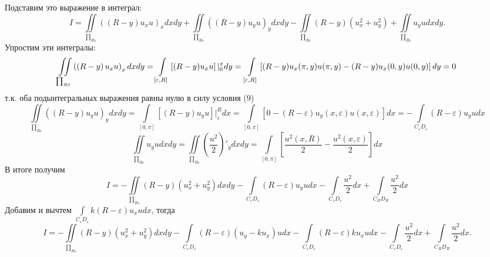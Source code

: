 \documentclass[9pt]{article}
\begin{document}
Подставим это выражение в интеграл:
\begin{equation*}
	I	=	\iint\limits_{\prod_{R\varepsilon}} \left( \left(R - y\right) u_x u\right)_x dx dy  + \iint\limits_{\prod_{R\varepsilon}} \left( \left(R - y\right) u_y u\right)_y dx dy  
	- \iint\limits_{\prod_{R\varepsilon}} \left(R- y\right) \left(u_x^2 + u_y^2\right) + \iint\limits_{\prod_{R\varepsilon}} u_y u dx dy.
\end{equation*}
Упростим эти интегралы:
\begin{equation*}
	\iint\limits_{\prod_{R\varepsilon}} \left( \left(R - y\right) u_x u\right)_x dx dy = \int\limits_{[\varepsilon, R]} \left[(R-y)u_xu\right] \vert_0^\pi dy = \\ \int\limits_{[\varepsilon, R]} \left[(R-y) u_x(\pi, y)u(\pi,y) - (R-y) u_x(0, y)u(0,y)\right]dy = 0
\end{equation*} т.к. оба подынтегральных выражения равны нулю в силу условия (9)
\begin{equation*}
	\iint\limits_{\prod_{R\varepsilon}} \left( \left(R - y\right) u_y u\right)_y dx dy = \int\limits_{[0,\pi]} \left[\left(R - y\right) u_y u\right] \vert_\varepsilon^R dx =
	\int\limits_{[0,\pi]} \left[0 - \left(R - \varepsilon \right) u_y(x, \varepsilon) u(x, \varepsilon) \right] dx =  - \int\limits_{C_\varepsilon D_\varepsilon} \left(R - \varepsilon \right) u_yu dx
\end{equation*}
\begin{equation*}
	\iint\limits_{\prod_{R\varepsilon}} u_y u dx dy = \iint\limits_{\prod_{R\varepsilon}} \left(\dfrac{u^2}{2}\right)'_ydx dy = \int\limits_{[0,\pi]} \left[\dfrac{u^2(x,R)}{2} - \dfrac{u^2(x, \varepsilon)}{2}\right] dx 
\end{equation*}
В итоге получим 
\begin{equation*}
	I = - \iint\limits_{\prod_{R\varepsilon}} \left(R - y\right) \left(u_x^2 + u_y^2\right) dx dy
	- \int\limits_{C_\varepsilon D_\varepsilon} \left(R - \varepsilon\right) u_y u dx 
	-\int\limits_{C_\varepsilon D_\varepsilon} \dfrac{u^2}{2} dx + \int\limits_{C_R D_R} \dfrac{u^2}{2} dx 
\end{equation*}
Добавим и вычтем $\int\limits_{C_\varepsilon D_\varepsilon} k\left(R - \varepsilon\right) u_x u dx$, тогда
\begin{equation*}
	I = - \iint\limits_{\prod_{R\varepsilon}} \left(R - y\right) \left(u_x^2 + u_y^2\right) dx dy - 
	\int\limits_{C_\varepsilon D_\varepsilon} \left(R - \varepsilon \right) \left(u_y - ku_x\right)u dx - \int\limits_{C_\varepsilon D_\varepsilon} \left(R - \varepsilon\right) k u_x u dx - \int\limits_{C_\varepsilon D_\varepsilon}\dfrac{u^2}{2} dx + \int\limits_{C_R D_R} \dfrac{u^2}{2}dx.
\end{equation*}
\end{document}
